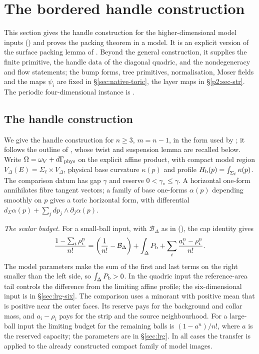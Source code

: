 \section{The bordered handle construction}\label{p2:sec-shd}

This section gives the handle construction for the higher-dimensional model inputs
() and proves the packing theorem in a model. It is an explicit version of the
surface packing lemma of \cite[\S3.2]{OpenAI2026}. Beyond the general construction, it supplies the finite primitive, the handle data of the
diagonal quadric, and the nondegeneracy and flow statements; the bump forms, tree primitives, normalisation, Moser
fields and the maps $\psi_i$ are fixed in \S\ref{sec:native-toric}, the layer maps in \S\ref{p2:sec-str}. The periodic
four-dimensional instance is .

\subsection{The handle construction}\label{p2:sec-machine-hdl}

We give the handle construction for $n\ge3$, $m=n-1$, in the form used by ; it
follows the outline of , whose twist and suspension lemma are recalled below. Write $\Omega=\omega_V+d\Gamma_{\rm phys}$ on the explicit affine product, with
compact model region $V_\Delta(E)=\Sigma_\ell\times V_\Delta$, physical base curvature $\kappa(p)$ and profile
$H_{\mathrm b}(p)=\int_{\Sigma_\ell}\kappa(p)$. The comparison datum has gap $\gamma$ and reserve $0<\gamma_*\le\gamma$. A horizontal
one-form annihilates fibre tangent vectors; a family of base one-forms $\alpha(p)$ depending smoothly on $p$ gives a
toric horizontal form, with differential $d_\Sigma\alpha(p)+\sum_jdp_j\wedge\partial_j\alpha(p)$.

\emph{The scalar budget.}\label{sec:mech-volume} For a small-ball input, with $\mathcal B_\Delta$ as in (), the cap identity gives
\begin{equation}\label{eq:mech-budget}
 \frac{1-\sum_i\rho_i^n}{n!}
 =\left(\frac1{n!}-\mathcal B_\Delta\right)
   +\int_\Delta P_{\mathrm b}
   +\sum_i\frac{a_i^n-\rho_i^n}{n!}.
\end{equation}
The model parameters make the sum of the first and last terms on the right smaller than the left side, so $\int_\Delta P_{\mathrm b}>0$. In the quadric input the reference-area tail controls the difference from the limiting affine profile; the six-dimensional input is in \S\ref{sec:lrg-six}. The comparison uses a minorant with positive mean that is positive near the outer faces. Its reserve pays for the background and collar mass, and $a_i-\rho_i$ pays for the strip and the source neighbourhood. For a large-ball input the limiting budget for the remaining balls is $(1-a^n)/n!$, where $a$ is the reserved capacity; the parameters are in \S\ref{sec:lrg}. In all cases the transfer is applied to the already constructed compact family of model images.

